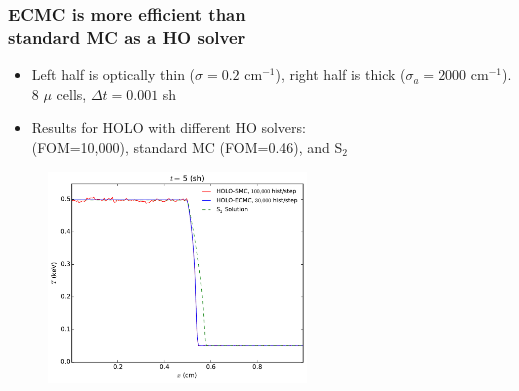 \documentclass[xcolor=dvipsnames,hyperref={pdfpagelabels=false},unknownkeysallowed]{beamer}
\newcommand{\colg}[1]{{\color{ForestGreen} #1}}
\newcommand{\colb}[1]{{\color{blue} #1}}
\newcommand{\colG}[1]{{\color{Gray!110} #1}}
\newcommand{\colr}[1]{{\color{red} #1}}
\newlength{\wideitemsep}
\let\olditem\item
\renewcommand{\item}{\setlength{\itemsep}{\wideitemsep}\olditem}
\begin{document}
\begin{frame}
    \frametitle{ECMC is more efficient than\\
 standard MC  as a HO solver }
{\addtolength\leftmargini{-0.345in}
    \centering
        \fontsize{10.0pt}{10.2pt}\selectfont
        \vspace{0.1in}
        \begin{itemize}
            \item Left half is optically thin ($\sigma\!=\!0.2$ cm$^{-1}$),
                right half is thick ($\sigma_a\!=\!2000$ cm$^{-1}$). \colG{8 $\mu$ cells,
                $\Delta t = 0.001$ sh}
            \item Results for HOLO with different HO solvers:\\
                \vspace{0.03in}\colb{ECMC} (FOM=10,000),  \colr{ standard MC}
                (FOM=0.46), and \colg{ S$_2$}
        \end{itemize}
    \begin{figure}
        \vspace{-0.1in} \includegraphics[width=0.6099\textwidth]{two_mat_ho_compare.pdf}
    \centering
    \end{figure}
}
\end{frame}
\end{document}
